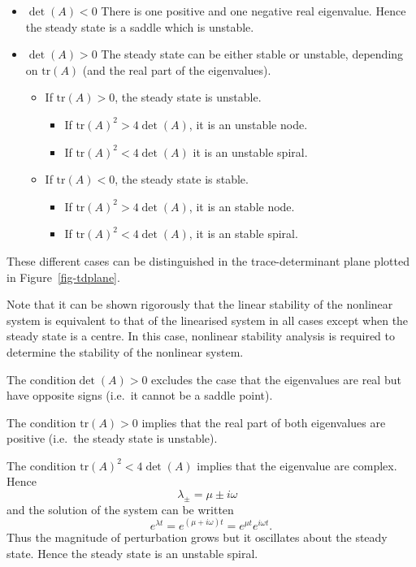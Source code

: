 \documentclass[
  letterpaper,
  DIV=11,
  numbers=noendperiod]{scrreprt}
\providecommand{\tightlist}{%
  \setlength{\itemsep}{0pt}\setlength{\parskip}{0pt}}
\begin{document}
\begin{itemize}
\item
  \(\det(A)<0\) There is one positive and one negative real eigenvalue.
  Hence the steady state is a saddle which is unstable.
\item
  \(\det(A)>0\) The steady state can be either stable or unstable,
  depending on \(\mathrm{tr}(A)\) (and the real part of the
  eigenvalues).

  \begin{itemize}
  \tightlist
  \item
    If \(\mathrm{tr}(A)>0\), the steady state is unstable.

    \begin{itemize}
    \tightlist
    \item
      If \(\mathrm{tr}(A)^2>4 \det(A)\), it is an unstable node.
    \item
      If \(\mathrm{tr}(A)^2<4 \det(A)\) it is an unstable spiral.
    \end{itemize}
  \item
    If \(\mathrm{tr}(A)<0\), the steady state is stable.

    \begin{itemize}
    \tightlist
    \item
      If \(\mathrm{tr}(A)^2>4 \det(A)\), it is an stable node.
    \item
      If \(\mathrm{tr}(A)^2<4 \det(A)\), it is an stable spiral.
    \end{itemize}
  \end{itemize}
\end{itemize}

These different cases can be distinguished in the trace-determinant
plane plotted in Figure~\ref{fig-tdplane}.

Note that it can be shown rigorously that the linear stability of the
nonlinear system is equivalent to that of the linearised system in all
cases except when the steady state is a centre. In this case, nonlinear
stability analysis is required to determine the stability of the
nonlinear system.

The condition\(\det(A)>0\) excludes the case that the eigenvalues are
real but have opposite signs (i.e.~it cannot be a saddle point).

The condition \(\mathrm{tr}(A)>0\) implies that the real part of both
eigenvalues are positive (i.e.~the steady state is unstable).

The condition \(\mathrm{tr}(A)^2<4 \det(A)\) implies that the eigenvalue
are complex. Hence \[
\lambda_{\pm}=\mu\pm i\omega \ \ \ 
\] and the solution of the system can be written \[
e^{\lambda t} = e^{(\mu+i\omega) t} = e^{\mu t}e^{i\omega t}. 
\] Thus the magnitude of perturbation grows but it oscillates about the
steady state. Hence the steady state is an unstable spiral.
\end{document}

